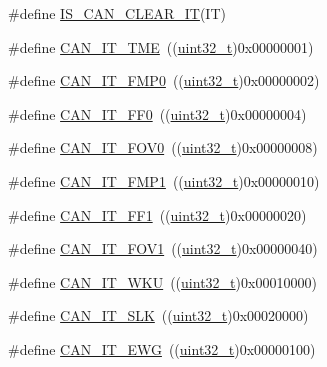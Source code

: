 \begin{DoxyCompactItemize}
\#define \hyperlink{group___c_a_n__interrupts_ga8b6e5fd6ddfe0141925f1e22cfbe7b85}{I\+S\+\_\+\+C\+A\+N\+\_\+\+C\+L\+E\+A\+R\+\_\+\+IT}(IT)
\item 
\#define \hyperlink{group___c_a_n__interrupts_ga619e36230fa2eb089a7c1936b5004eb9}{C\+A\+N\+\_\+\+I\+T\+\_\+\+T\+ME}~((\hyperlink{_p_e___types_8h_a33594304e786b158f3fb30289278f5af}{uint32\+\_\+t})0x00000001)
\item 
\#define \hyperlink{group___c_a_n__interrupts_ga3fe6fbf53e9d692957e87ad329bcd362}{C\+A\+N\+\_\+\+I\+T\+\_\+\+F\+M\+P0}~((\hyperlink{_p_e___types_8h_a33594304e786b158f3fb30289278f5af}{uint32\+\_\+t})0x00000002)
\item 
\#define \hyperlink{group___c_a_n__interrupts_gabf63043d9216de80ddc7ffe57b23ef67}{C\+A\+N\+\_\+\+I\+T\+\_\+\+F\+F0}~((\hyperlink{_p_e___types_8h_a33594304e786b158f3fb30289278f5af}{uint32\+\_\+t})0x00000004)
\item 
\#define \hyperlink{group___c_a_n__interrupts_ga066a4317f95669e5b5931c9a759cf248}{C\+A\+N\+\_\+\+I\+T\+\_\+\+F\+O\+V0}~((\hyperlink{_p_e___types_8h_a33594304e786b158f3fb30289278f5af}{uint32\+\_\+t})0x00000008)
\item 
\#define \hyperlink{group___c_a_n__interrupts_gaa0e101053fb203629e0e9a954213e71e}{C\+A\+N\+\_\+\+I\+T\+\_\+\+F\+M\+P1}~((\hyperlink{_p_e___types_8h_a33594304e786b158f3fb30289278f5af}{uint32\+\_\+t})0x00000010)
\item 
\#define \hyperlink{group___c_a_n__interrupts_ga93b86d884ce0624b4b36c991fd75fc1c}{C\+A\+N\+\_\+\+I\+T\+\_\+\+F\+F1}~((\hyperlink{_p_e___types_8h_a33594304e786b158f3fb30289278f5af}{uint32\+\_\+t})0x00000020)
\item 
\#define \hyperlink{group___c_a_n__interrupts_ga963301fdbede5f9a9665dc5b6210eaec}{C\+A\+N\+\_\+\+I\+T\+\_\+\+F\+O\+V1}~((\hyperlink{_p_e___types_8h_a33594304e786b158f3fb30289278f5af}{uint32\+\_\+t})0x00000040)
\item 
\#define \hyperlink{group___c_a_n__interrupts_gac9c8767770d94de753dda9ad31f9af15}{C\+A\+N\+\_\+\+I\+T\+\_\+\+W\+KU}~((\hyperlink{_p_e___types_8h_a33594304e786b158f3fb30289278f5af}{uint32\+\_\+t})0x00010000)
\item 
\#define \hyperlink{group___c_a_n__interrupts_ga639d4ab2777d9a2f8b7e67071b091059}{C\+A\+N\+\_\+\+I\+T\+\_\+\+S\+LK}~((\hyperlink{_p_e___types_8h_a33594304e786b158f3fb30289278f5af}{uint32\+\_\+t})0x00020000)
\item 
\#define \hyperlink{group___c_a_n__interrupts_ga8a9f04ddf6ebe169d32b951a8ea135b3}{C\+A\+N\+\_\+\+I\+T\+\_\+\+E\+WG}~((\hyperlink{_p_e___types_8h_a33594304e786b158f3fb30289278f5af}{uint32\+\_\+t})0x00000100)

\end{DoxyCompactItemize}
